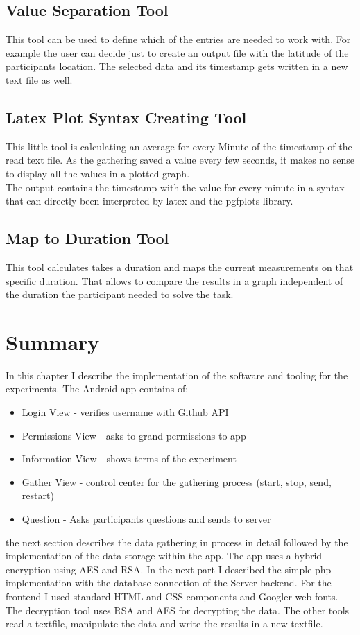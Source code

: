 \subsection{Value Separation  Tool}
This tool can be used to define which of the entries are needed to work with. For example the user can decide just to create an output file with the latitude of the participants location. The selected data and its timestamp gets written in a new text file as well. 

\subsection{Latex Plot Syntax Creating Tool}
This little tool is calculating an average for every Minute of the timestamp of the read text file. As the gathering saved a value every few seconds, it makes no sense to display all the values in a plotted graph.\\
The output contains the timestamp with the value for every minute in a syntax that can directly been interpreted by latex and the pgfplots library. 

\subsection{Map to Duration Tool}
This tool calculates takes a duration and maps the current measurements on that specific duration. That allows to compare the results in a graph independent of the duration the participant needed to solve the task. 

\section{Summary}
In this chapter I describe the implementation of the software and tooling for the experiments. 
\bigbreak
The Android app contains of:
\begin{itemize}
\item Login View - verifies username with Github API
\item Permissions View - asks to grand permissions to app
\item Information View - shows terms of the experiment
\item Gather View - control center for the gathering process (start, stop, send, restart)
\item Question - Asks participants questions and sends to server
\end{itemize}
the next section describes the data gathering in process in detail followed by the implementation of the data storage within the app. The app uses a hybrid encryption using AES and RSA. 
\bigbreak
In the next part I described the simple php implementation with the database connection of the Server backend. For the frontend I used standard HTML and CSS components and Googler web-fonts.
The decryption tool uses RSA and AES for decrypting the data. The other tools read a textfile, manipulate the data and write the results in a new textfile.  
